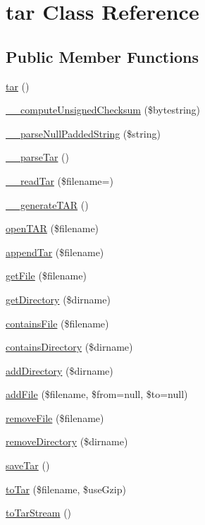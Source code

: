 \hypertarget{classtar}{}\section{tar Class Reference}
\label{classtar}
\subsection*{Public Member Functions}
\begin{DoxyCompactItemize}
\item 
\hyperlink{classtar_a310c3cc3417ea0fdb5c1c96cc5b47efa}{tar} ()
\item 
\hyperlink{classtar_a2f9a99c49a3ab86475a1cd26e722c0fa}{\+\_\+\+\_\+compute\+Unsigned\+Checksum} (\$bytestring)
\item 
\hyperlink{classtar_ab9d60205cd0862d6d3cfb582b43a3288}{\+\_\+\+\_\+parse\+Null\+Padded\+String} (\$string)
\item 
\hyperlink{classtar_a8d8793668fa7e2de0beb4dca399ee3ed}{\+\_\+\+\_\+parse\+Tar} ()
\item 
\hyperlink{classtar_a1422972f8f5afac82f82ecab505b4079}{\+\_\+\+\_\+read\+Tar} (\$filename=\textquotesingle{}\textquotesingle{})
\item 
\hyperlink{classtar_a97fd04b02c85bbb3eb588a160237f375}{\+\_\+\+\_\+generate\+T\+A\+R} ()
\item 
\hyperlink{classtar_a62fc429d1e33de90d1ce65c3c16a4193}{open\+T\+A\+R} (\$filename)
\item 
\hyperlink{classtar_a3c35ee6b05a860a0108afa5853db4070}{append\+Tar} (\$filename)
\item 
\hyperlink{classtar_a8eb93e97f657daf1a3671c60f7093745}{get\+File} (\$filename)
\item 
\hyperlink{classtar_a02157ed6604bec5f931ad08d1c5c048f}{get\+Directory} (\$dirname)
\item 
\hyperlink{classtar_ac7ba975f7bcf57d9a8167feb7122933e}{contains\+File} (\$filename)
\item 
\hyperlink{classtar_aff90f763b61b935c856eb7e634a2c0a7}{contains\+Directory} (\$dirname)
\item 
\hyperlink{classtar_a046188f5c3141d52246774c13ab2c895}{add\+Directory} (\$dirname)
\item 
\hyperlink{classtar_a374a307255a5fc5110749b1e37946947}{add\+File} (\$filename, \$from=null, \$to=null)
\item 
\hyperlink{classtar_a51cd4b11f9e4e6c9c5c0bc93d5a063c7}{remove\+File} (\$filename)
\item 
\hyperlink{classtar_a17971edb42a8be66b554ca5d6cf6bc1e}{remove\+Directory} (\$dirname)
\item 
\hyperlink{classtar_ac70edc9fc85a3106aaa3c07a3a57a0a2}{save\+Tar} ()
\item 
\hyperlink{classtar_acfe90e92d12e463da735e3c42e5a74f1}{to\+Tar} (\$filename, \$use\+Gzip)
\item 
\hyperlink{classtar_a347041e79cbe8f150933afe77f35826f}{to\+Tar\+Stream} ()
\end{DoxyCompactItemize}
